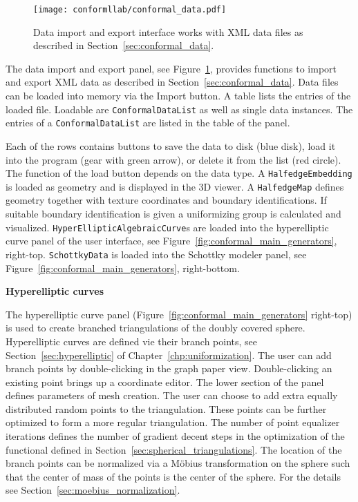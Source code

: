 \documentclass[Thesis.tex]{subfiles}
\begin{document}
\begin{figure}
\centering
\texttt{[image: conformllab/conformal\_data.pdf]}
\caption{Data import and export interface works with XML data files as described in 
Section~\ref{sec:conformal_data}.}
\label{fig:data_interface}
\end{figure}

The data import and export panel, see Figure~\ref{fig:data_interface}, provides functions to import and export XML data as described in Section~\ref{sec:conformal_data}.  
Data files can be loaded into memory via the Import button. A table lists the entries of the loaded file.  
Loadable are {\tt ConformalDataList} as well as single data instances. 
The entries of a {\tt ConformalDataList} are listed in the table of the panel. 

Each of the rows contains buttons to save the data to disk (blue disk), load it into the program (gear with green arrow), or delete it from the list (red circle).  
The function of the load button depends on the data type. 
A {\tt HalfedgeEmbedding} is loaded as geometry and is displayed in the 3D viewer. 
A {\tt HalfedgeMap} defines geometry together with texture coordinates and boundary identifications. 
If suitable boundary identification is given a uniformizing group is calculated and visualized. 
{\tt HyperEllipticAlgebraicCurve}s are loaded into the hyperelliptic curve panel of the user interface, see Figure~\ref{fig:conformal_main_generators}, right-top.  
{\tt SchottkyData} is loaded into the Schottky modeler panel, see Figure~\ref{fig:conformal_main_generators}, right-bottom.


{\bf Hyperelliptic curves}

The hyperelliptic curve panel (Figure~\ref{fig:conformal_main_generators} right-top) is used to create branched triangulations of the doubly covered sphere.
Hyperelliptic curves are defined vie their branch points, see Section~\ref{sec:hyperelliptic} of Chapter~\ref{chp:uniformization}.
The user can add branch points by double-clicking in the graph paper view.
Double-clicking an existing point brings up a coordinate editor. 
The lower section of the panel defines parameters of mesh creation. 
The user can choose to add extra equally distributed random points to the triangulation.
These points can be further optimized to form a more regular triangulation.
The number of point equalizer iterations defines the number of gradient decent steps in the optimization of the functional defined in Section~\ref{sec:spherical_triangulations}.
The location of the branch points can be normalized via a M{\"o}bius transformation on the sphere such that the center of mass of the points is the center of the sphere. For the details see Section~\ref{sec:moebius_normalization}.
\end{document}
